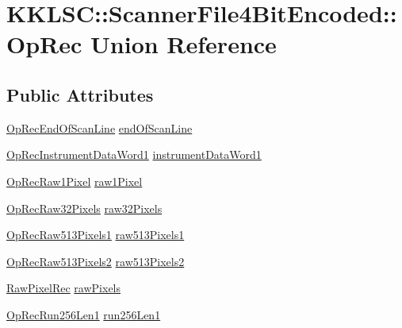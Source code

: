 \hypertarget{union_scanner_file4_bit_encoded_1_1_op_rec}{}\section{K\+K\+L\+SC\+:\+:Scanner\+File4\+Bit\+Encoded\+:\+:Op\+Rec Union Reference}
\label{union_scanner_file4_bit_encoded_1_1_op_rec}
\subsection*{Public Attributes}
\begin{DoxyCompactItemize}
\item 
\hyperlink{struct_scanner_file4_bit_encoded_1_1_op_rec_end_of_scan_line}{Op\+Rec\+End\+Of\+Scan\+Line} \hyperlink{union_scanner_file4_bit_encoded_1_1_op_rec_a6804eecd59e1568f2b8f8e0812235a70}{end\+Of\+Scan\+Line}
\item 
\hyperlink{struct_scanner_file4_bit_encoded_1_1_op_rec_instrument_data_word1}{Op\+Rec\+Instrument\+Data\+Word1} \hyperlink{union_scanner_file4_bit_encoded_1_1_op_rec_aeee50b40e1ed660888405fbffcb33057}{instrument\+Data\+Word1}
\item 
\hyperlink{struct_scanner_file4_bit_encoded_1_1_op_rec_raw1_pixel}{Op\+Rec\+Raw1\+Pixel} \hyperlink{union_scanner_file4_bit_encoded_1_1_op_rec_a421bca9e023482f4c28858beda4d4d9c}{raw1\+Pixel}
\item 
\hyperlink{struct_scanner_file4_bit_encoded_1_1_op_rec_raw32_pixels}{Op\+Rec\+Raw32\+Pixels} \hyperlink{union_scanner_file4_bit_encoded_1_1_op_rec_aa8c4a6bdf3892f68d4bad812de20cd32}{raw32\+Pixels}
\item 
\hyperlink{struct_scanner_file4_bit_encoded_1_1_op_rec_raw513_pixels1}{Op\+Rec\+Raw513\+Pixels1} \hyperlink{union_scanner_file4_bit_encoded_1_1_op_rec_ae7c501fc7a91ab17b857359a0b459cea}{raw513\+Pixels1}
\item 
\hyperlink{struct_scanner_file4_bit_encoded_1_1_op_rec_raw513_pixels2}{Op\+Rec\+Raw513\+Pixels2} \hyperlink{union_scanner_file4_bit_encoded_1_1_op_rec_a78ccb14eccac6a9529b67e2d55dde837}{raw513\+Pixels2}
\item 
\hyperlink{struct_scanner_file4_bit_encoded_1_1_raw_pixel_rec}{Raw\+Pixel\+Rec} \hyperlink{union_scanner_file4_bit_encoded_1_1_op_rec_a06ecd8c4ba24c693e0fba9510aa16a39}{raw\+Pixels}
\item 
\hyperlink{struct_scanner_file4_bit_encoded_1_1_op_rec_run256_len1}{Op\+Rec\+Run256\+Len1} \hyperlink{union_scanner_file4_bit_encoded_1_1_op_rec_ad03651ffff11a7287da647531ccf9eda}{run256\+Len1}

\end{DoxyCompactItemize}
